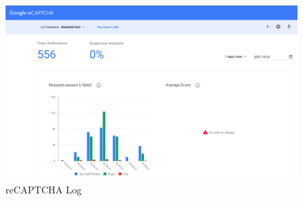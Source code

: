 \begin{figure}[H]
    \centering
    \includegraphics[width=\textwidth]{pics/recaptchaLog.png}
    \caption{reCAPTCHA Log}
    \label{fig:cha3fig1recaptchalog}
\end{figure}
